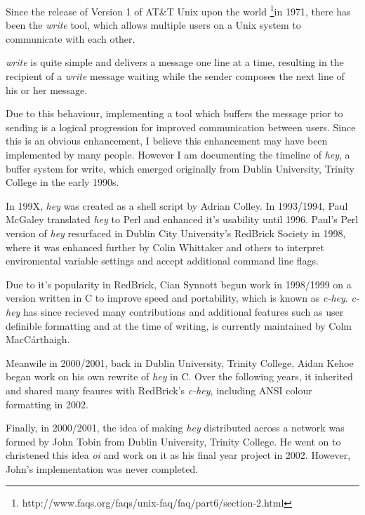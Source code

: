 Since the release of Version 1 of AT\&T Unix upon the world 
\footnote{http://www.faqs.org/faqs/unix-faq/faq/part6/section-2.html}{in 1971}, 
there has been the \emph{write} tool, which allows multiple users on a Unix 
system to communicate with each other.


\emph{write} is quite simple and delivers a message one line at a time,
resulting in the recipient of a \emph{write} message waiting while the
sender composes the next line of his or her message.


Due to this behaviour, implementing a tool which buffers the message
prior to sending is a logical progression for improved communication
between users. Since this is an obvious enhancement, I believe this
enhancement may have been implemented by many people. However I am 
documenting the timeline of \emph{hey}, a buffer system for write,
which emerged originally from Dublin University, Trinity College in the 
early 1990s.


In 199X, \emph{hey} was created as a shell script by Adrian Colley. In 
1993/1994, Paul McGaley translated \emph{hey} to Perl and enhanced it's 
usability until 1996. Paul's Perl version of \emph{hey} resurfaced in 
Dublin City University's RedBrick Society in 1998, where it was enhanced
further by Colin Whittaker and others to interpret enviromental variable 
settings and accept additional command line flags.


Due to it's popularity in RedBrick, Cian Synnott begun work in 1998/1999
on a version written in C to improve speed and portability, which is 
known as \emph{c-hey}. \emph{c-hey} has since recieved many 
contributions and additional features such as user definible formatting 
and at the time of writing, is currently maintained by Colm 
MacC\'{a}rthaigh.


Meanwile in 2000/2001, back in Dublin University, Trinity College, Aidan 
Kehoe began work on his own rewrite of \emph{hey} in C. Over the 
following years, it inherited and shared many feaures with RedBrick's 
\emph{c-hey}, including ANSI colour formatting in 2002.


Finally, in 2000/2001, the idea of making \emph{hey} distributed across 
a network was formed by John Tobin from Dublin University, Trinity 
College.  He went on to christened this idea \emph{oi} and work on it 
as his final year project in 2002. However, John's implementation was
never completed.
